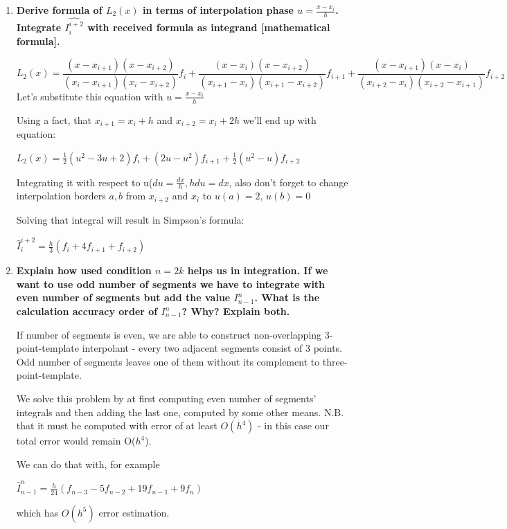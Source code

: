 \documentclass{article}
\begin{document}
\begin{enumerate}
    \item \textbf{Derive formula of $L_{2}(x)$ in terms of interpolation phase $ u = \frac{x - x_{i}}{h} $. Integrate $ \hat{I_{i}^{i+2}}$ with received formula as integrand [mathematical formula].}
    
    $$
    L_2(x) = \frac{(x-x_{i+1})(x-x_{i+2})}{(x_i-x_{i+1})(x_i-x_{i+2})}f_i + 
    \frac{(x-x_{i})(x-x_{i+2})}{(x_{i+1}-x_{i})(x_{i+1}-x_{i+2})}f_{i+1} + 
    \frac{(x-x_{i+1})(x-x_i)}{(x_{i+2}-x_i)(x_{i+2}-x_{i+1})}f_{i+2}
    $$
    Let's substitute this equation with  $u=\frac{x-x_i}{h}$
    
    Using a fact, that $x_{i+1} = x_i+h$ and $x_{i+2} = x_i+2h$
    we'll end up with equation:
    
   $ L_2(x)=\frac{1}{2}(u^2-3u+2)f_i + (2u-u^2)f_{i+1} + \frac{1}{2}(u^2-u)f_{i+2}$
   
   Integrating it with respect to u($du = \frac{dx}{h}, hdu = dx$, also don't forget to change interpolation borders ${a, b}$ from $x_{i+2}$ and $x_{i}$ to $u(a) = 2$, $u(b) = 0$
   
   Solving that integral will result in Simpson's formula:
   
    $\hat{I}^{i+2}_{i} = \frac{h}{3}(f_i+4f_{i+1}+f_{i+2})$
    
    \item \textbf{Explain how used condition $n = 2k$ helps us in integration. If we want to use odd number of segments we have to integrate with even number of segments but add the value $I_{n-1}^n$. What is the calculation accuracy order of $I_{n-1}^n$? Why? Explain both.}
    
    If number of segments is even, we are able to construct non-overlapping 3-point-template interpolant - every two adjacent segments consist of 3 points. Odd number of segments leaves one of them without its complement to three-point-template.
    
    We solve this problem by at first computing even number of segments' integrals and then adding the last one, computed by some other means. N.B. that it must be computed with error of at least $O(h^4)$ - in this case our total error would remain O($h^4$).
    
    We can do that with, for example
    
    $\hat{I}^{n}_{n-1} = \frac{h}{24}(f_{n-3}-5f_{n-2} +19f_{n-1} +9f_n)$
    
    which has $O(h^5)$ error estimation.
    

\end{enumerate}
\end{document}
